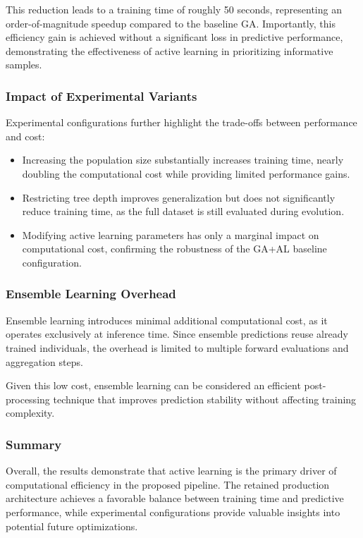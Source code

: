 \documentclass[12pt,a4paper]{article}
\begin{document}
This reduction leads to a training time of roughly 50 seconds, representing an order-of-magnitude speedup compared to the baseline GA. Importantly, this efficiency gain is achieved without a significant loss in predictive performance, demonstrating the effectiveness of active learning in prioritizing informative samples.

\medskip

\subsubsection{Impact of Experimental Variants}

Experimental configurations further highlight the trade-offs between performance and cost:
\begin{itemize}
    \item Increasing the population size substantially increases training time, nearly doubling the computational cost while providing limited performance gains.
    \item Restricting tree depth improves generalization but does not significantly reduce training time, as the full dataset is still evaluated during evolution.
    \item Modifying active learning parameters has only a marginal impact on computational cost, confirming the robustness of the GA+AL baseline configuration.
\end{itemize}

\medskip

\subsubsection{Ensemble Learning Overhead}

Ensemble learning introduces minimal additional computational cost, as it operates exclusively at inference time. Since ensemble predictions reuse already trained individuals, the overhead is limited to multiple forward evaluations and aggregation steps.

Given this low cost, ensemble learning can be considered an efficient post-processing technique that improves prediction stability without affecting training complexity.

\medskip

\subsubsection{Summary}

Overall, the results demonstrate that active learning is the primary driver of computational efficiency in the proposed pipeline. The retained production architecture achieves a favorable balance between training time and predictive performance, while experimental configurations provide valuable insights into potential future optimizations.
\end{document}
